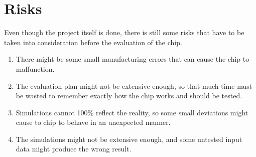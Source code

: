 \section{Risks} \label{sec:risks}
Even though the project itself is done, there is still some risks that have to be taken into consideration before the evaluation of the chip.

\begin{enumerate}
	\item There might be some small manufacturing errors that can cause the chip to malfunction.
	\item The evaluation plan might not be extensive enough, so that much time must be wasted to remember exactly how the chip works and should be tested.
	\item Simulations cannot 100\% reflect the reality, so some small deviations might cause to chip to behave in an unexpected manner.
	\item The simulations might not be extensive enough, and some untested input data might produce the wrong result.
\end{enumerate}